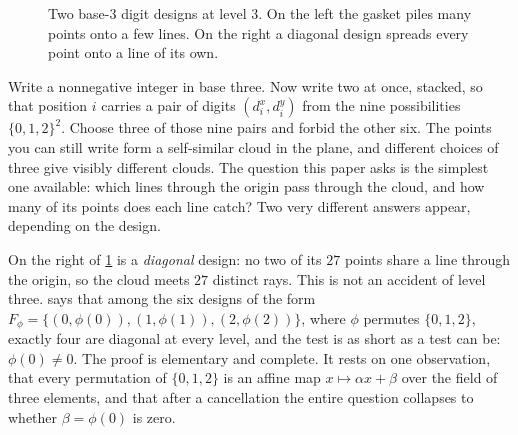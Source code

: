 \documentclass[11pt]{amsart}
\theoremstyle{definition}
\theoremstyle{remark}
\begin{document}
\begin{figure}[!h]
\centering
{}
\caption{Two base-3 digit designs at level $3$. On the left the gasket piles many points onto a few lines. On the right a diagonal design spreads every point onto a line of its own.}
\label{fig:rays}
\end{figure}

Write a nonnegative integer in base three. Now write two at once, stacked, so that position $i$ carries a pair of digits $(d^x_i, d^y_i)$ from the nine possibilities $\{0,1,2\}^2$. Choose three of those nine pairs and forbid the other six. The points you can still write form a self-similar cloud in the plane, and different choices of three give visibly different clouds. The question this paper asks is the simplest one available: which lines through the origin pass through the cloud, and how many of its points does each line catch? Two very different answers appear, depending on the design.

On the right of \cref{fig:rays} is a \emph{diagonal} design: no two of its $27$ points share a line through the origin, so the cloud meets $27$ distinct rays. This is not an accident of level three.  says that among the six designs of the form $F_\phi=\{(0,\phi(0)),(1,\phi(1)),(2,\phi(2))\}$, where $\phi$ permutes $\{0,1,2\}$, exactly four are diagonal at every level, and the test is as short as a test can be: $\phi(0)\neq 0$. The proof is elementary and complete. It rests on one observation, that every permutation of $\{0,1,2\}$ is an affine map $x\mapsto \alpha x+\beta$ over the field of three elements, and that after a cancellation the entire question collapses to whether $\beta=\phi(0)$ is zero.
\end{document}
